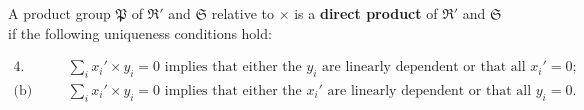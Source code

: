 A product group $\mathfrak{P}$ of $\mathfrak{R}'$ and $\mathfrak{S}$ relative to $\times$ is a \textbf{direct product} of $\mathfrak{R}'$ and $\mathfrak{S}$ if the following uniqueness conditions hold:

$$
\begin{aligned}
\text{4. (a)}&\quad \sum_i x_i' \times y_i = 0 \text{ implies that either the } y_i \text{ are linearly dependent or that all } x_i' = 0;\\[4pt]
\text{(b)}&\quad \sum_i x_i' \times y_i = 0 \text{ implies that either the } x_i' \text{ are linearly dependent or that all } y_i = 0.
\end{aligned}
$$
